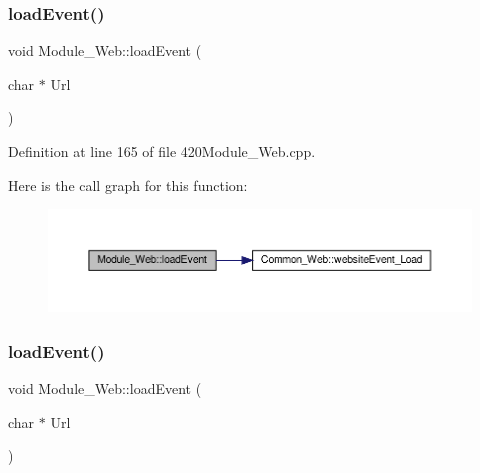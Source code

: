\mbox{\label{class_module___web_a319dfebbedf0114d2953d00fd1a33ad1}} 
\subsubsection{\texorpdfstring{load\+Event()}{loadEvent()}\hspace{0.1cm}{\footnotesize\ttfamily [1/2]}}
{\footnotesize\ttfamily void Module\+\_\+\+Web\+::load\+Event (\begin{DoxyParamCaption}\item[{char $\ast$}]{Url }\end{DoxyParamCaption})}



Definition at line 165 of file 420\+Module\+\_\+\+Web.\+cpp.

Here is the call graph for this function\+:
\nopagebreak
\begin{figure}[H]
\begin{center}
\leavevmode
\includegraphics[width=350pt]{class_module___web_a319dfebbedf0114d2953d00fd1a33ad1_cgraph}
\end{center}
\end{figure}
\mbox{\label{class_module___web_a319dfebbedf0114d2953d00fd1a33ad1}} 
\subsubsection{\texorpdfstring{load\+Event()}{loadEvent()}\hspace{0.1cm}{\footnotesize\ttfamily [2/2]}}
{\footnotesize\ttfamily void Module\+\_\+\+Web\+::load\+Event (\begin{DoxyParamCaption}\item[{char $\ast$}]{Url }\end{DoxyParamCaption})}

